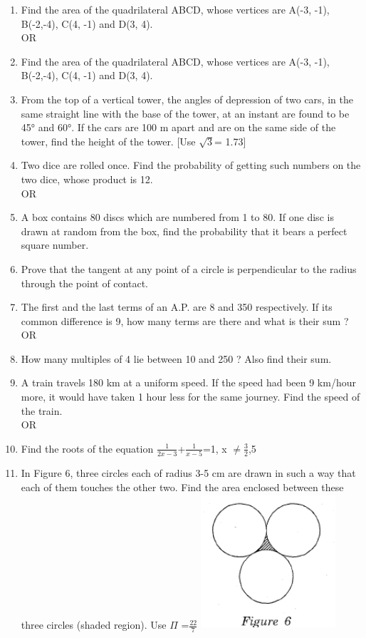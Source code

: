 \documentclass[journal,12pt,twocolumn]{IEEEtran}
\renewcommand\thesection{\arabic{section}}
\begin{document}
\begin{enumerate}[label=\thesection.\arabic*.,ref=\thesection.\theenumi]
\item Find the area of the quadrilateral ABCD, whose vertices are A(-3, -1), B(-2,-4), C(4, -1) and D(3, 4).\\
OR\\
\item Find the area of the quadrilateral ABCD, whose vertices are A(-3, -1), B(-2,-4), C(4, -1) and D(3, 4).
\item From the top of a vertical tower, the angles of depression of two cars, in the same straight line with the base of the tower, at an instant are found to be 45° and 60°. If the cars are 100 m apart and are on the same side of the tower, find the height of the tower. [Use $\sqrt{3} $= 1.73]
\item Two dice are rolled once. Find the probability of getting such numbers on the two dice, whose product is 12.\\
OR\\
\item A box contains 80 discs which are numbered from 1 to 80. If one disc is drawn at random from the box, find the probability that it bears a perfect square number.
\item Prove that the tangent at any point of a circle is perpendicular to the radius through the point of contact.
\item The first and the last terms of an A.P. are 8 and 350 respectively. If its common difference is 9, how many terms are there and what is their sum ?\\
OR\\
\item  How many multiples of 4 lie between 10 and 250 ? Also find their sum.
\item A train travels 180 km at a uniform speed. If the speed had been 9 km/hour more, it would have taken 1 hour less for the same journey. Find the speed of the train.\\
OR\\
\item Find the roots of the equation $\frac{1}{2x-3}$+$\frac{1}{x-5}$=1, x $\neq \frac{3}{2}$,5
\item In Figure 6, three circles each of radius 3-5 cm are drawn in such a way that each of them touches the other two. Find the area enclosed between these three circles (shaded region). Use $\Pi$ =$\frac{22}{7}$
\includegraphics[width=5cm,height=5cm,center]{8.png}

\end{enumerate}
\end{document}
